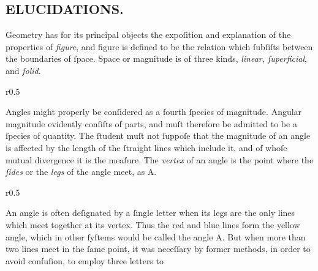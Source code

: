 \begin{minipage}{0.20\textwidth}
    \phantom{}
\end{minipage}%
\begin{minipage}{0.80\textwidth}
    \begin{center}
        \subsection[Elucidations]{\centering \scshape{\LARGE{ELUCIDATIONS.}}}
        \label{subsec:elucidations}
    \end{center}

    \hfill

    Geometry has for its principal objects the expoſition and explanation of the properties of \textit{figure}, and figure is defined to be the relation which ſubſiſts between the boundaries of ſpace. Space or magnitude is of three kinds, \textit{linear, ſuperficial}, and \textit{ſolid}.\\

    \hfill

    \begin{wrapfigure}{r}{0.5\textwidth}
        \centering
        
    \end{wrapfigure}
    Angles might properly be conſidered as a fourth ſpecies of magnitude. Angular magnitude evidently conſiſts of parts, and muſt therefore be admitted to be a ſpecies of quantity. The ſtudent muſt not ſuppoſe that the magnitude of an angle is affected by the length of the ſtraight lines which include it, and of whoſe mutual divergence it is the meaſure. The \textit{vertex} of an angle is the point where the \textit{ſides} or the \textit{legs} of the angle meet, as A.

    \hfill

    \begin{wrapfigure}{r}{0.5\textwidth}
        \centering
        
    \end{wrapfigure}
    An angle is often deſignated by a ſingle letter when its legs are the only lines which meet together at its vertex. Thus the red and blue lines form the yellow angle, which in other ſyſtems would be called the angle A. But when more than two lines meet in the ſame point, it was neceſſary by former methods, in order to avoid confuſion, to employ three letters to
\end{minipage}

